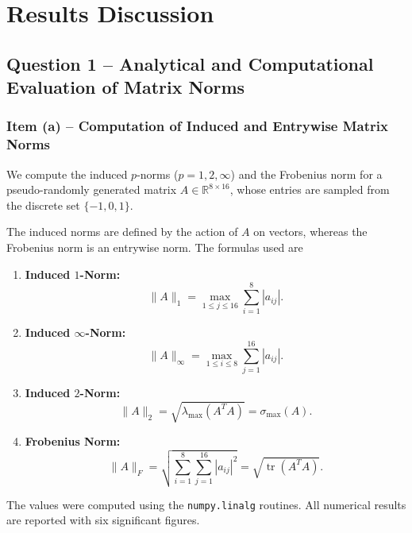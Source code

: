 \section{Results Discussion}

\subsection{Question 1 -- Analytical and Computational Evaluation of Matrix Norms}

\subsubsection*{Item (a) -- Computation of Induced and Entrywise Matrix Norms}

We compute the induced $p$-norms ($p=1,2,\infty$) and the Frobenius norm for a pseudo-randomly generated matrix $A\in\mathbb{R}^{8\times16}$, whose entries are sampled from the discrete set $\{-1,0,1\}$.

The induced norms are defined by the action of $A$ on vectors, whereas the Frobenius norm is an entrywise norm. The formulas used are

\begin{enumerate}
    \item \textbf{Induced $1$-Norm:}
    \begin{equation}
        \|A\|_1=\max_{1\leq j\leq16}\sum_{i=1}^{8}|a_{ij}|.
    \end{equation}

    \item \textbf{Induced $\infty$-Norm:}
    \begin{equation}
        \|A\|_{\infty}=\max_{1\leq i\leq8}\sum_{j=1}^{16}|a_{ij}|.
    \end{equation}

    \item \textbf{Induced $2$-Norm:}
    \begin{equation}
        \|A\|_2=\sqrt{\lambda_{\max}(A^TA)}
        =\sigma_{\max}(A).
    \end{equation}

    \item \textbf{Frobenius Norm:}
    \begin{equation}
        \|A\|_F=
        \sqrt{\sum_{i=1}^{8}\sum_{j=1}^{16}|a_{ij}|^2}
        =\sqrt{\operatorname{tr}(A^TA)}.
    \end{equation}
\end{enumerate}

The values were computed using the \texttt{numpy.linalg} routines. All numerical results are reported with six significant figures.

